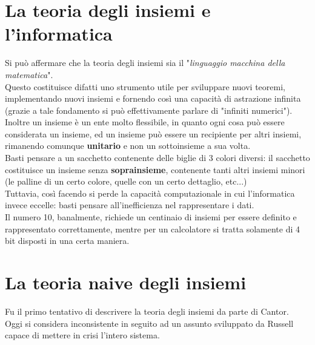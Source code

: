 \documentclass[12pt]{article}
\begin{document}
\section{La teoria degli insiemi e l'informatica}
Si può affermare che la teoria degli insiemi sia il "\textit{linguaggio macchina della matematica}".\\
Questo costituisce difatti uno strumento utile per sviluppare nuovi teoremi, implementando nuovi insiemi e fornendo così una capacità di astrazione infinita (grazie a tale fondamento si può effettivamente parlare di "infiniti numerici").\\
Inoltre un insieme è un ente molto flessibile, in quanto ogni cosa può essere considerata un insieme, ed un insieme può essere un recipiente per altri insiemi, rimanendo comunque \textbf{unitario} e non un sottoinsieme a sua volta.\\
Basti pensare a un sacchetto contenente delle biglie di 3 colori diversi: il sacchetto costituisce un insieme senza \textbf{soprainsieme}, contenente tanti altri insiemi minori (le palline di un certo colore, quelle con un certo dettaglio, etc...)\\
Tuttavia, così facendo si perde la capacità computazionale in cui l'informatica invece eccelle: basti pensare all'inefficienza nel rappresentare i dati.\\
Il numero 10, banalmente, richiede un centinaio di insiemi per essere definito e rappresentato correttamente, mentre per un calcolatore si tratta solamente di 4 bit disposti in una certa maniera.
\section{La teoria naive degli insiemi}
Fu il primo tentativo di descrivere la teoria degli insiemi da parte di Cantor.\\
Oggi si considera inconsistente in seguito ad un assunto sviluppato da Russell capace di mettere in crisi l'intero sistema.\\
\end{document}
